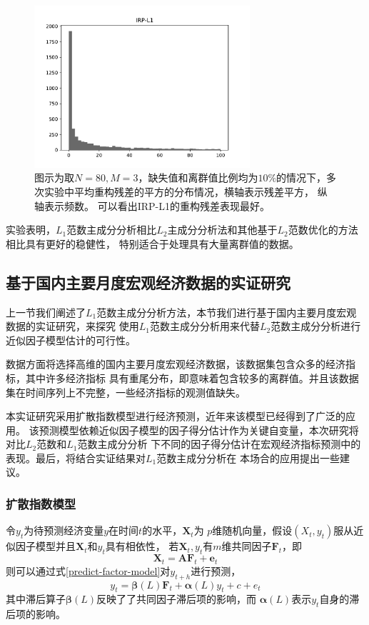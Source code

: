 \begin{figure}[H]
\begin{minipage}[t]{0.48\textwidth}
    \includegraphics[width=8cm]{pics/lab1/IRP-L1.pdf}
    \end{minipage}
    \caption{\small 图示为取$N = 80, M=3$，缺失值和离群值比例均为$10\%$的情况下，多次实验中平均重构残差的平方的分布情况，横轴表示残差平方，
    纵轴表示频数。
    可以看出IRP-L1的重构残差表现最好。}
\end{figure}

实验表明，$L_1$范数主成分分析相比$L_2$主成分分析法和其他基于$L_2$范数优化的方法相比具有更好的稳健性，
特别适合于处理具有大量离群值的数据。

\subsection{基于国内主要月度宏观经济数据的实证研究}
上一节我们阐述了$L_1$范数主成分分析方法，本节我们进行基于国内主要月度宏观数据的实证研究，来探究
使用$L_1$范数主成分分析用来代替$L_2$范数主成分分析进行近似因子模型估计的可行性。

数据方面将选择高维的国内主要月度宏观经济数据，该数据集包含众多的经济指标，其中许多经济指标
具有重尾分布，即意味着包含较多的离群值。并且该数据集在时间序列上不完整，一些经济指标的观测值缺失。

本实证研究采用扩散指数模型进行经济预测\cite{stock2002macroeconomic}，近年来该模型已经得到了广泛的应用。
该预测模型依赖近似因子模型的因子得分估计作为关键自变量，本次研究将对比$L_2$范数和$L_1$范数主成分分析
下不同的因子得分估计在宏观经济指标预测中的表现。最后，将结合实证结果对$L_1$范数主成分分析在
本场合的应用提出一些建议。

\subsubsection{扩散指数模型}
令$y_t$为待预测经济变量$y$在时间$t$的水平，$\bm{X}_t$为
$p$维随机向量，假设$(X_t,y_t)$服从近似因子模型并且$\bm{X}_t$和$y_t$具有相依性，
若$\bm{X}_t, y_t$有$m$维共同因子$\bm{F}_t$，即
\begin{equation}
    \bm{X}_t = \bm{A}\bm{F}_t + \bm{e}_t
\end{equation}
则可以通过式\eqref{predict-factor-model}对$y_{t+h}$进行预测，
\begin{equation}\label{predict-factor-model}
    y_t = \bm{\beta}(L)\bm{F}_t + \bm{\alpha}(L)y_t + c + e_t
\end{equation}
其中滞后算子$\bm{\beta}(L)$反映了了共同因子滞后项的影响，而
$\bm{\alpha}(L)$表示$y_t$自身的滞后项的影响。

